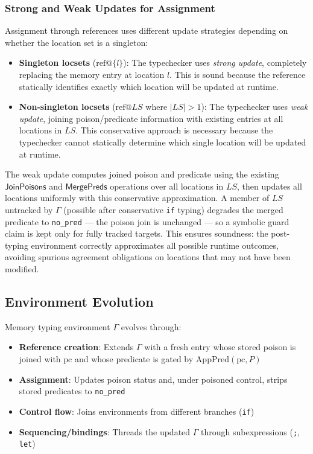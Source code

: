 \documentclass[12pt]{article}
\begin{document}
\subsubsection{Strong and Weak Updates for Assignment}

Assignment through references uses different update strategies depending on whether the location set is a singleton:

\begin{itemize}
    \item \textbf{Singleton locsets} ($\text{ref} @ \{l\}$): The typechecker uses \emph{strong update}, completely replacing the memory entry at location $l$. This is sound because the reference statically identifies exactly which location will be updated at runtime.
    
    \item \textbf{Non-singleton locsets} ($\text{ref} @ LS$ where $|LS| > 1$): The typechecker uses \emph{weak update}, joining poison/predicate information with existing entries at all locations in $LS$. This conservative approach is necessary because the typechecker cannot statically determine which single location will be updated at runtime.
\end{itemize}

The weak update computes joined poison and predicate using the existing $\mathsf{JoinPoisons}$ and $\mathsf{MergePreds}$ operations over all locations in $LS$, then updates all locations uniformly with this conservative approximation. A member of $LS$ untracked by $\Gamma$ (possible after conservative \texttt{if} typing) degrades the merged predicate to \texttt{no\_pred} --- the poison join is unchanged --- so a symbolic guard claim is kept only for fully tracked targets. This ensures soundness: the post-typing environment correctly approximates all possible runtime outcomes, avoiding spurious agreement obligations on locations that may not have been modified.

\subsection{Environment Evolution}

Memory typing environment $\Gamma$ evolves through:
\begin{itemize}
    \item \textbf{Reference creation}: Extends $\Gamma$ with a fresh entry whose stored poison is joined with $\text{pc}$ and whose predicate is gated by $\mathrm{AppPred}(\text{pc}, P)$
    \item \textbf{Assignment}: Updates poison status and, under poisoned control, strips stored predicates to \texttt{no\_pred}
    \item \textbf{Control flow}: Joins environments from different branches (\texttt{if})
    \item \textbf{Sequencing/bindings}: Threads the updated $\Gamma$ through subexpressions (\texttt{;}, \texttt{let})
\end{itemize}
\end{document}
